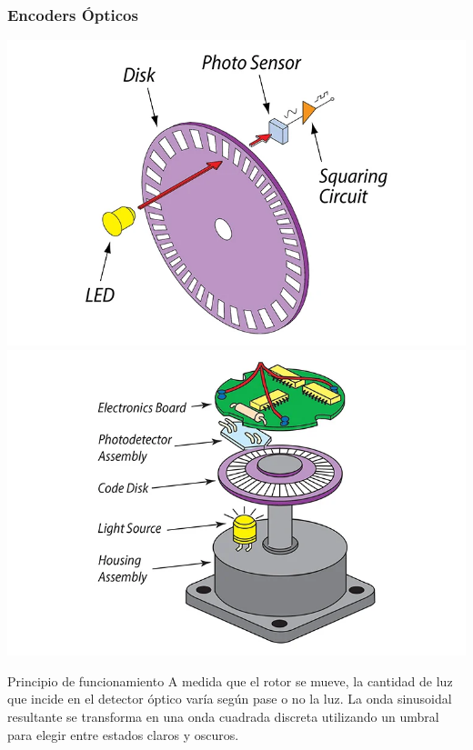 \begin{frame}
    \frametitle{Encoders Ópticos}
    \scriptsize
    \includegraphics[width=0.45\columnwidth]{images/encoder_principle}
    \includegraphics[width=0.46\columnwidth]{images/encoder_parts}
    \footnotesize

    \begin{block}{Principio de funcionamiento}
        A medida que el rotor se mueve, la cantidad de luz que incide en el detector óptico varía según pase o no la luz. La onda sinusoidal resultante se transforma en una onda cuadrada discreta utilizando un umbral para elegir entre estados claros y oscuros. %
    \end{block}
\end{frame}

